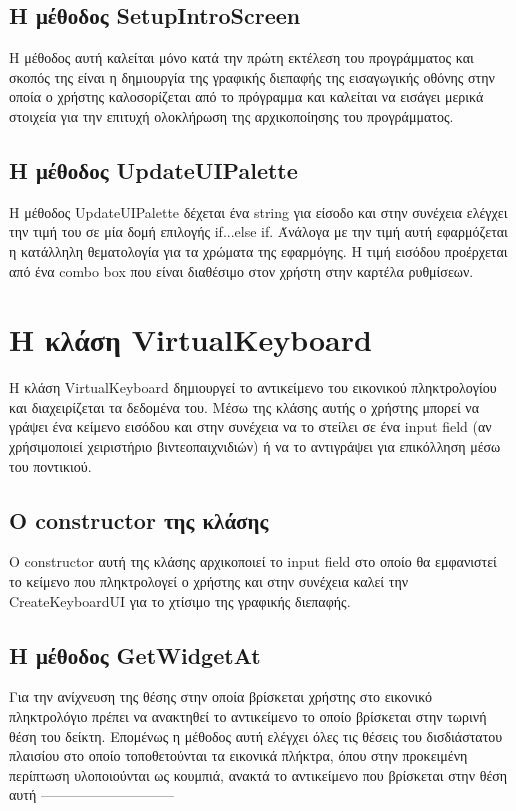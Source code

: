 \subsection{Η μέθοδος SetupIntroScreen}
Η μέθοδος αυτή καλείται μόνο κατά την πρώτη εκτέλεση του προγράμματος και σκοπός της
είναι η δημιουργία της γραφικής διεπαφής της εισαγωγικής οθόνης στην οποία ο χρήστης
καλοσορίζεται από το πρόγραμμα και καλείται να εισάγει μερικά στοιχεία για την επιτυχή
ολοκλήρωση της αρχικοποίησης του προγράμματος. 


\subsection{Η μέθοδος UpdateUIPalette}
Η μέθοδος UpdateUIPalette δέχεται ένα string για είσοδο και στην συνέχεια
ελέγχει την τιμή του σε μία δομή επιλογής if...else if. Άνάλογα με την τιμή αυτή εφαρμόζεται
η κατάλληλη θεματολογία για τα χρώματα της εφαρμόγης. Η τιμή εισόδου προέρχεται από
ένα combo box που είναι διαθέσιμο στον χρήστη στην καρτέλα ρυθμίσεων.






\section{Η κλάση VirtualKeyboard}

Η κλάση VirtualKeyboard δημιουργεί το αντικείμενο του εικονικού πληκτρολογίου και διαχειρίζεται
τα δεδομένα του. Μέσω της κλάσης αυτής ο χρήστης μπορεί να γράψει ένα κείμενο εισόδου και στην
συνέχεια να το στείλει σε ένα input field (αν χρήσιμοποιεί χειριστήριο βιντεοπαιχνιδιών) ή να 
το αντιγράψει για επικόλληση μέσω του ποντικιού.  


\subsection{Ο constructor της κλάσης}
Ο constructor αυτή της κλάσης αρχικοποιεί το input field στο οποίο θα εμφανιστεί το κείμενο που
πληκτρολογεί ο χρήστης και στην συνέχεια καλεί την CreateKeyboardUI για το χτίσιμο της γραφικής
διεπαφής.


\subsection{Η μέθοδος GetWidgetAt}
Για την ανίχνευση της θέσης στην οποία βρίσκεται χρήστης στο εικονικό πληκτρολόγιο πρέπει να
ανακτηθεί το αντικείμενο το οποίο βρίσκεται στην τωρινή θέση του δείκτη. Επομένως η μέθοδος
αυτή ελέγχει όλες τις θέσεις του δισδιάστατου πλαισίου στο οποίο τοποθετούνται τα εικονικά
πλήκτρα, όπου στην προκειμένη περίπτωση υλοποιούνται ως κουμπιά, ανακτά το αντικείμενο που
βρίσκεται στην θέση αυτή -----------------------------

